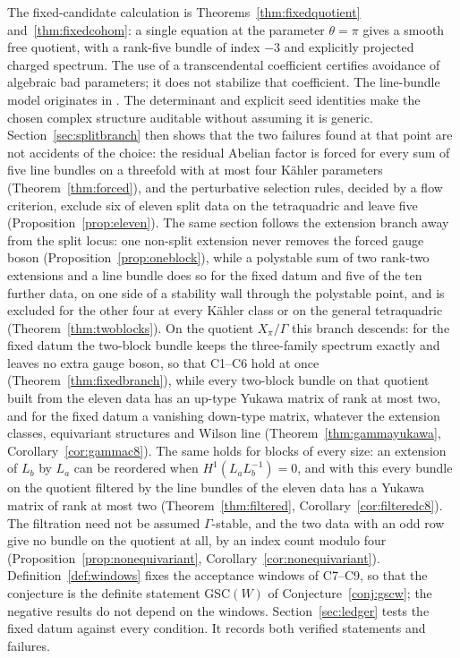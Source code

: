 The fixed-candidate calculation is
Theorems~\ref{thm:fixedquotient} and~\ref{thm:fixedcohom}:
a single equation at the parameter $\theta=\pi$ gives a smooth free
quotient, with a rank-five bundle of index $-3$ and explicitly projected
charged spectrum. The use of a transcendental coefficient certifies
avoidance of algebraic bad parameters; it does not stabilize that
coefficient. The line-bundle model originates in \cite{BCL}.
The determinant and explicit seed identities make the chosen
complex structure auditable without assuming it is generic.
Section~\ref{sec:splitbranch} then shows that the two failures found at
that point are not accidents of the choice: the residual Abelian factor
is forced for every sum of five line bundles on a threefold with at most
four K\"ahler parameters (Theorem~\ref{thm:forced}), and the perturbative
selection rules, decided by a flow criterion, exclude six of eleven split
data on the tetraquadric and leave five (Proposition~\ref{prop:eleven}).
The same section follows the extension branch away from the split locus:
one non-split extension never removes the forced gauge boson
(Proposition~\ref{prop:oneblock}), while a polystable sum of two rank-two
extensions and a line bundle does so for the fixed datum and five of the
ten further data, on one side of a stability wall through the polystable
point, and is excluded for the other four at every K\"ahler class or on
the general tetraquadric (Theorem~\ref{thm:twoblocks}). On the quotient
$X_\pi/\Gamma$ this branch descends: for the fixed datum the two-block bundle
keeps the three-family spectrum exactly and leaves no extra gauge boson,
so that C1--C6 hold at once (Theorem~\ref{thm:fixedbranch}), while every
two-block bundle on that quotient built from the eleven data has an
up-type Yukawa matrix of rank at most two, and for the fixed datum a
vanishing down-type matrix, whatever the extension classes, equivariant
structures and Wilson line (Theorem~\ref{thm:gammayukawa},
Corollary~\ref{cor:gammac8}). The same holds for blocks of every size: an
extension of $L_b$ by $L_a$ can be reordered when
$H^1(L_aL_b^{-1})=0$, and with this every bundle on the quotient filtered
by the line bundles of the eleven data has a Yukawa matrix of rank at most
two (Theorem~\ref{thm:filtered}, Corollary~\ref{cor:filteredc8}). The
filtration need not be assumed $\Gamma$-stable, and the two data with an
odd row give no bundle on the quotient at all, by an index count modulo
four (Proposition~\ref{prop:nonequivariant},
Corollary~\ref{cor:nonequivariant}).
Definition~\ref{def:windows} fixes the acceptance windows of C7--C9, so
that the conjecture is the definite statement GSC$(W)$ of
Conjecture~\ref{conj:gscw}; the negative results do not depend on the
windows. Section~\ref{sec:ledger} tests the fixed datum against every
condition. It records both verified statements and failures.


